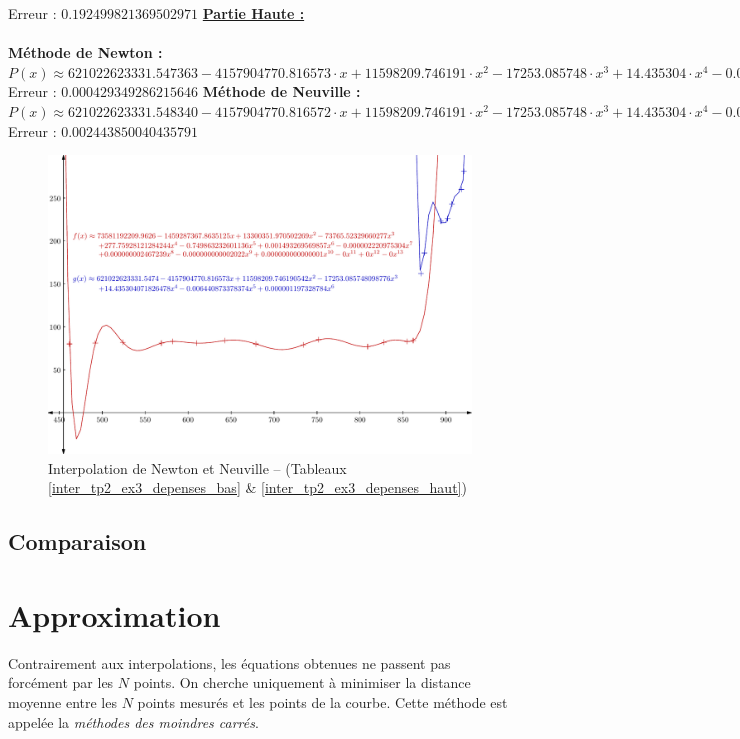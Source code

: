 \documentclass{report}
\begin{document}
	Erreur : $0.192499821369502971$
	\newline
	\newline
	\newline
	\underline{\textbf{Partie Haute :}} \\ \\
	\textbf{Méthode de Newton :}\\
	$P(x) \approx 621022623331.547363-4157904770.816573 \cdot x + 11598209.746191 \cdot x^{2} - 17253.085748 \cdot x^{3}  + 14.435304 \cdot x^{4} - 0.006441 \cdot x^{5}  + 0.000001 \cdot x^{6} $\\
	Erreur : $0.000429349286215646$
	\newline
	\newline
	\textbf{Méthode de Neuville :}\\
	$P(x) \approx 621022623331.548340-4157904770.816572 \cdot x + 11598209.746191 \cdot x^{2} - 17253.085748 \cdot x^{3}  + 14.435304 \cdot x^{4} - 0.006441 \cdot x^{5}  + 0.000001 \cdot x^{6} $\\
	Erreur : $0.002443850040435791$
      \newpage
      \begin{figure}[h]
	\centering
	\includegraphics[scale=0.85]{graphiques/pdf_output/inter_tp2_ex3.pdf}
	\caption{Interpolation de Newton et Neuville -- (Tableaux \ref{inter_tp2_ex3_depenses_bas} \& \ref{inter_tp2_ex3_depenses_haut})}
      \end{figure}
    \newpage
    \section{Comparaison}
  \chapter{Approximation}
  	Contrairement aux interpolations, les équations obtenues ne passent pas forcément par les $N$ points. On cherche uniquement à minimiser la distance moyenne entre les $N$ points mesurés et les points de la courbe. Cette méthode est appelée la \textit{méthodes des moindres carrés}.
\end{document}
